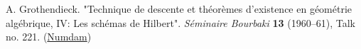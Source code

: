 
A. Grothendieck.
"Technique de descente et théorèmes d'existence en géométrie algébrique, IV: Les schémas de Hilbert".
\emph{Séminaire Bourbaki} \textbf{13} (1960–61), Talk no. 221.
(\href{http://www.numdam.org/book-part/SB_1960-1961__6__249_0/}{Numdam})

